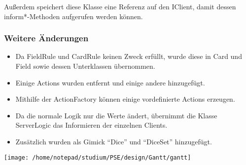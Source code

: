 \documentclass[a4paper,10pt]{article}
\begin{document}
Außerdem speichert diese Klasse eine Referenz auf den IClient, damit dessen inform*-Methoden aufgerufen werden können.

\subsubsection{Weitere Änderungen}
\begin{itemize}
\item Da FieldRule und CardRule keinen Zweck erfüllt, wurde diese in Card und Field sowie dessen Unterklassen übernommen.
\item Einige Actions wurden entfernt und einige andere hinzugefügt.
\item Mithilfe der ActionFactory können einige vordefinierte Actions erzeugen.
\item Da die normale Logik nur die Werte ändert, übernimmt die Klasse ServerLogic das Informieren der einzelnen Clients.
\item Zusätzlich wurden als Gimick ``Dice'' und ``DiceSet'' hinzugefügt.
\end{itemize}

\newpage
\texttt{[image: /home/notepad/studium/PSE/design/Gantt/gantt]}
\end{document}
